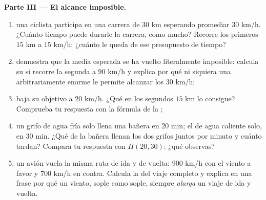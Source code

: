 \begin{problem}
\medskip
\noindent\textbf{Parte III --- El alcance imposible.}
\begin{enumerate}[resume]
  \item una ciclista participa en una carrera de $30$ km esperando promediar
        $30$ km/h. ¿Cuánto tiempo puede durarle la carrera, como
        mucho? Recorre los primeros $15$ km a $15$ km/h: ¿cuánto
        le queda de ese presupuesto de tiempo?
  \item demuestra que la media esperada se ha vuelto literalmente
        imposible: calcula su  si recorre la
        segunda  a $90$ km/h y explica por qué ni siquiera una
         arbitrariamente enorme le permite alcanzar los
        $30$ km/h;
  \item baja su objetivo a $20$ km/h. ¿Qué  en los
        segundos $15$ km lo consigue? Comprueba tu respuesta con la
        fórmula de la ;
  \item un grifo de agua fría solo llena una bañera en $20$ min; el de agua caliente solo,
        en $30$ min. ¿Qué  de la bañera llenan los dos
        grifos juntos por minuto y cuánto tardan?
        Compara tu respuesta con $H(20, 30)$: ¿qué
        observas?
  \item un avión vuela la misma ruta de ida y de vuelta: $900$ km/h
        con el viento a favor y $700$ km/h en contra. Calcula la
         del viaje completo y explica en una frase por qué
        un viento, sople como sople, siempre \emph{alarga} un viaje
        de ida y vuelta.
\end{enumerate}
\end{problem}
